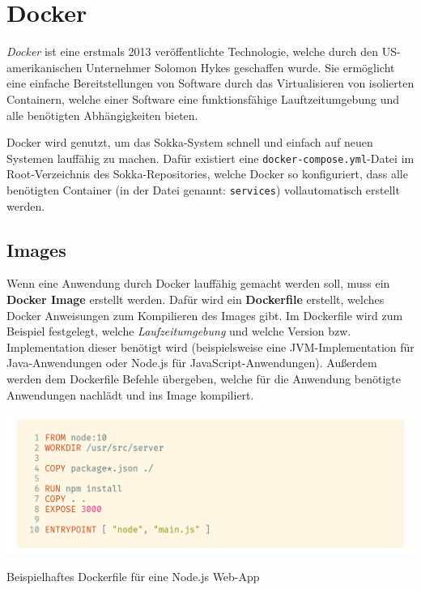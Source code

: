 \section{Docker}

\textit{Docker} ist eine erstmals 2013 veröffentlichte Technologie, welche durch den US-amerikanischen Unternehmer Solomon Hykes geschaffen wurde. \cite{hykes2018} Sie ermöglicht eine einfache Bereitstellungen von Software durch das Virtualisieren von isolierten Containern, welche einer Software eine funktionsfähige Lauftzeitumgebung und alle benötigten Abhängigkeiten bieten.

Docker wird genutzt, um das Sokka-System schnell und einfach auf neuen Systemen lauffähig zu machen. Dafür existiert eine \lstinline{docker-compose.yml}-Datei im Root-Verzeichnis des Sokka-Repositories, welche Docker so konfiguriert, dass alle benötigten Container (in der Datei genannt: \lstinline{services}) vollautomatisch erstellt werden.

\subsection{Images}

Wenn eine Anwendung durch Docker lauffähig gemacht werden soll, muss ein \textbf{Docker Image} erstellt werden. Dafür wird ein \textbf{Dockerfile} erstellt, welches Docker Anweisungen zum Kompilieren des Images gibt. Im Dockerfile wird zum Beispiel festgelegt, welche \textit{Laufzeitumgebung} und welche Version bzw. Implementation dieser benötigt wird (beispielsweise eine JVM-Implementation für Java-Anwendungen oder Node.js für JavaScript-Anwendungen). Außerdem werden dem Dockerfile Befehle übergeben, welche für die Anwendung benötigte Anwendungen nachlädt und ins Image kompiliert.

\begin{code}[htp]
    \begin{center}
        \includegraphics[width=1\textwidth]{images/Docker/dockerfile.png}
        \caption{Beispielhaftes Dockerfile für eine Node.js Web-App}
    \end{center}
\end{code}

